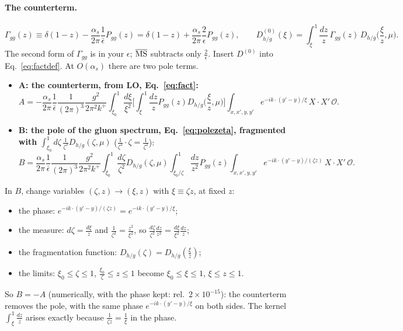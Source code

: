 \documentclass[10pt]{article}
\numberwithin{equation}{section}
\newcommand{\OO}{\mathcal O}
\newcommand{\pre}{\frac{1}{(2\pi)^3}\frac{g^2}{2\pi^2k^+}}
\begin{document}
\paragraph{The counterterm.}
\begin{equation}
\boxed{\Gamma_{gg}(z)\equiv\delta(1-z)-\frac{\alpha_s}{2\pi}\frac{1}{\bar\epsilon}P_{gg}(z)=\delta(1-z)+\frac{\alpha_s}{2\pi}\frac{2}{\epsilon}P_{gg}(z),\qquad
D^{(0)}_{h/g}(\xi)=\int_\xi^1\frac{dz}{z}\,\Gamma_{gg}(z)\,D_{h/g}\Big(\frac{\xi}{z},\mu\Big).}
\label{eq:Gamma}
\end{equation}
The second form of $\Gamma_{gg}$ is in your $\epsilon$; $\overline{\rm MS}$ subtracts only $\frac{2}{\epsilon}$. Insert $D^{(0)}$ into Eq.~\eqref{eq:factdef}. At $O(\alpha_s)$ there are two pole terms.
\begin{itemize}
\item \textbf{A: the counterterm, from LO, Eq.~\eqref{eq:fact}:}
\begin{equation*}
A=-\frac{\alpha_s}{2\pi}\frac{1}{\bar\epsilon}\pre\int_{\xi_0}^1\frac{d\xi}{\xi^2}\Big[\int_\xi^1\frac{dz}{z}P_{gg}(z)D_{h/g}\Big(\frac{\xi}{z},\mu\Big)\Big]\int_{x,x',y,y'}e^{-ik\cdot(y'-y)/\xi}\,X\cdot X'\,\OO .
\end{equation*}
\item \textbf{B: the pole of the gluon spectrum, Eq.~\eqref{eq:polezeta}, fragmented with $\int_{\xi_0}^1d\zeta\,\frac{1}{\zeta^3}D_{h/g}(\zeta,\mu)$} ($\frac{1}{\zeta^3}\cdot\zeta=\frac{1}{\zeta^2}$):
\begin{equation*}
B=\frac{\alpha_s}{2\pi}\frac{1}{\bar\epsilon}\pre\int_{\xi_0}^1\frac{d\zeta}{\zeta^2}D_{h/g}(\zeta,\mu)\int_{\xi_0/\zeta}^1\frac{dz}{z^2}P_{gg}(z)\int_{x,x',y,y'}e^{-ik\cdot(y'-y)/(\zeta z)}\,X\cdot X'\,\OO .
\end{equation*}
\end{itemize}
In $B$, change variables $(\zeta,z)\to(\xi,z)$ with $\xi\equiv\zeta z$, at fixed $z$:
\begin{itemize}
\item the phase: $e^{-ik\cdot(y'-y)/(\zeta z)}=e^{-ik\cdot(y'-y)/\xi}$;
\item the measure: $d\zeta=\frac{d\xi}{z}$ and $\frac{1}{\zeta^2}=\frac{z^2}{\xi^2}$, so $\frac{d\zeta}{\zeta^2}\frac{dz}{z^2}=\frac{d\xi}{\xi^2}\frac{dz}{z}$;
\item the fragmentation function: $D_{h/g}(\zeta)=D_{h/g}(\frac{\xi}{z})$;
\item the limits: $\xi_0\le\zeta\le1$, $\frac{\xi_0}{\zeta}\le z\le1$ become $\xi_0\le\xi\le1$, $\xi\le z\le1$.
\end{itemize}
So $B=-A$ (numerically, with the phase kept: rel.\ $2\times10^{-15}$): the counterterm removes the pole, with the same phase $e^{-ik\cdot(y'-y)/\xi}$ on both sides. The kernel $\int_\xi^1\frac{dz}{z}$ arises exactly because $\frac{1}{\zeta z}=\frac1\xi$ in the phase.
\end{document}
